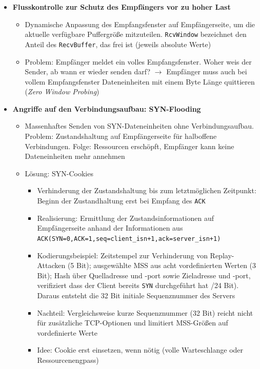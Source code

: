 \begin{itemize}
\begin{itemize}
\begin{minipage}{\linewidth}
			\end{minipage}
	\end{itemize}
	\item \textbf{Flusskontrolle zur Schutz des Empfängers vor zu hoher Last}
	\begin{itemize}
		\item Dynamische Anpassung des Empfangsfenster auf Empfängerseite, um die aktuelle verfügbare Puffergröße mitzuteilen. \texttt{RcvWindow} bezeichnet den Anteil des \texttt{RecvBuffer}, das frei ist (jeweils absolute Werte)
		\item Problem: Empfänger meldet ein volles Empfangsfenster. Woher weis der Sender, ab wann er wieder senden darf? \(\rightarrow\) Empfänger muss auch bei vollem Empfangsfenster Dateneinheiten mit einem Byte Länge quittieren (\textit{Zero Window Probing})
	\end{itemize}
	\item \textbf{Angriffe auf den Verbindungsaufbau: SYN-Flooding}
	\begin{itemize}
		\item Massenhaftes Senden von SYN-Dateneinheiten ohne Verbindungsaufbau. Problem: Zustandshaltung auf Empfängerseite für halboffene Verbindungen. Folge: Ressourcen erschöpft, Empfänger kann keine Dateneinheiten mehr annehmen
		\item Lösung: SYN-Cookies
		\begin{itemize}
			\item Verhinderung der Zustandshaltung bis zum letztmöglichen Zeitpunkt: Beginn der Zustandhaltung erst bei Empfang des \texttt{ACK}
			\item Realisierung: Ermittlung der Zustandsinformationen auf Empfängerseite anhand der Informationen aus \texttt{ACK(SYN=0,ACK=1,seq=client\_isn+1,ack=server\_isn+1)}
			\item Kodierungsbeispiel: Zeitstempel zur Verhinderung von Replay-Attacken (5 Bit); ausgewählte MSS aus acht vordefinierten Werten (3 Bit); Hash über Quelladresse und -port sowie Zieladresse und -port, verifiziert dass der Client bereits \texttt{SYN} durchgeführt hat /24 Bit). Daraus entsteht die 32 Bit initiale Sequenznummer des Servers
			\item Nachteil: Vergleichsweise kurze Sequenznummer (32 Bit) reicht nicht für zusätzliche TCP-Optionen und limitiert MSS-Größen auf vordefinierte Werte
			\item Idee: Cookie erst einsetzen, wenn nötig (volle Warteschlange oder Ressourcenengpass)
		\end{itemize}
	\end{itemize}
\end{itemize}

